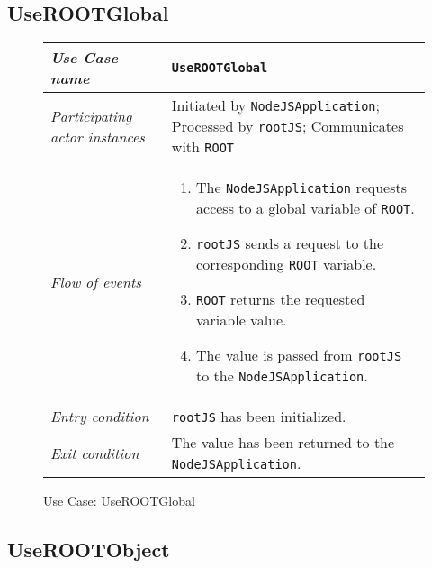 \subsection{UseROOTGlobal}

\begin{figure}[htb]
	\centering
	\begin{longtable}{p{3cm} @{\hskip 1cm} p{12cm}}
		\hline
		
		\textit{Use Case name} & \texttt{UseROOTGlobal}\\
		\hline
		
		\textit{Participating actor instances} & Initiated by \texttt{NodeJSApplication}; Processed by \texttt{rootJS}; Communicates with \texttt{ROOT}\\
		\hline
		
		\textit{Flow of events} &
			\begin{enumerate}
				\item The \texttt{NodeJSApplication} requests access to a global variable of \texttt{ROOT}.
			
				\item \texttt{rootJS} sends a request to the corresponding \texttt{ROOT} variable.
			
				\item \texttt{ROOT} returns the requested variable value.
	          
	            \item The value is passed from \texttt{rootJS} to the \texttt{NodeJSApplication}.
			\end{enumerate}
			\\
		\hline
		
		\textit{Entry condition} & \texttt{rootJS} has been initialized.\\
		\hline
		
		\textit{Exit condition} & The value has been returned to the \texttt{NodeJSApplication}.\\
        \hline
	\end{longtable}
	
	\caption{Use Case: UseROOTGlobal}
\end{figure}

\pagebreak

\subsection{UseROOTObject}

